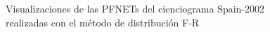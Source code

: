 \documentclass[10pt,a4paper,spanish]{article}
\numberwithin{equation}{section} %
\numberwithin{figure}{section} %
\numberwithin{table}{section} %
\begin{document}
\begin{figure}[!h]
{{            \label{q4frsp}
        }
    }
    \caption{Visualizaciones de las PFNETs del cienciograma Spain-2002 realizadas con el método de distribución F-R}
    \label{frsp}
\end{figure}
\end{document}
